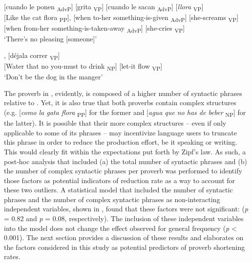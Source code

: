 \documentclass[output=paper,colorlinks,citecolor=brown,draftmode]{langscibook}
\begin{document}
\ea
{} {[{cuando le ponen} \textsubscript{AdvP}]} {[{grita} \textsubscript{VP}]} {[{cuando le sacan} \textsubscript{AdvP}]} {[\emph{llora} \textsubscript{VP}]}\\
{[{Like the cat flora} \textsubscript{PP}],}		{[{when to-her something-is-given} \textsubscript{AdvP}]} {[{she-screams} \textsubscript{VP}]}	{[{when from-her something-is-taken-away} \textsubscript{AdvP}]}
{[{she-cries} \textsubscript{VP}]} \\
\glt ‘There’s no pleasing [someone]’\\
\label{item:outlier1_phrases}
\z

\ea 
{}, {[{déjala correr} \textsubscript{VP}]}\\
{[{Water that no you-must to drink} \textsubscript{NP}]}  	{[{let-it flow} \textsubscript{VP}]}\\ 
\glt ‘Don’t be the dog in the manger’\\\label{item:outlier2_phrases}
\z

The proverb in , evidently, is composed of a higher number of syntactic phrases relative to . Yet, it is also true that both proverbs contain complex structures (e.g. {[\emph{como la gata flora} \textsubscript{PP}]} for the former and {[\emph{agua que no has de beber} \textsubscript{NP}]} for the latter). It is possible that their more complex structures -- even if only applicable to some of its phrases -- may incentivize language users to truncate this phrase in order to reduce the production effort, be it speaking or writing. This would clearly fit within the expectations put forth by Zipf's law. As such, a post-hoc analysis that included (a) the total number of syntactic phrases and (b) the number of complex syntactic phrases per proverb was performed to identify those factors as potential indicators of reduction rate as a way to account for these two outliers. A statistical model that included the number of syntactic phrases and the number of complex syntactic phrases as non-interacting independent variables, shown in , found that these factors were not significant: (\textit{p} = 0.82 and \textit{p} = 0.08, respectively). The inclusion of these independent variables into the model does not change the effect observed for general frequency (\textit{p} \textless{} 0.001). The next section provides a discussion of these results and elaborates on the factors considered in this study as potential predictors of proverb shortening rates.
\end{document}
